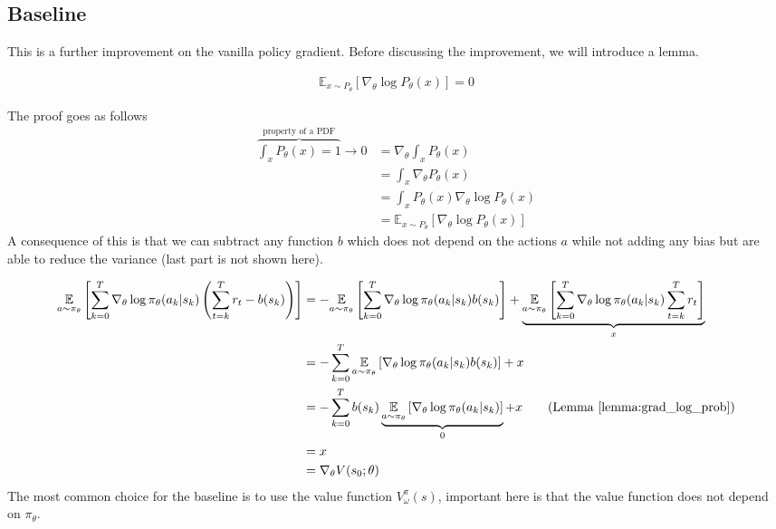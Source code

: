\subsection{Baseline}
This is a further improvement on the vanilla policy gradient. Before discussing the improvement,
we will introduce a lemma. 
\begin{lemma} \label{lemma:grad_log_prob}
    \begin{align}
    \mathbb{E}_{x\sim P_{\theta}}\left[\nabla_{\theta} \log{P_{\theta}(x)}\right] =0
\end{align}
\end{lemma}
The proof goes as follows 
\begin{align*}
    \overbrace{\int_x P_{\theta}(x) = 1}^{\text{property of a PDF}} \rightarrow  
    0&=\nabla_{\theta}\int_x P_{\theta}(x) \\
    &= \int_x \nabla_{\theta} P_{\theta}(x) \\
    &=  \int_x P_{\theta}(x) \nabla_{\theta} \log{P_{\theta}(x)} \\
    &=  \mathbb{E}_{x\sim P_{\theta}}\left[\nabla_{\theta} \log{P_{\theta}(x)}\right]
\end{align*}
A consequence of this is that we can subtract any function $b$ which does not depend on the actions 
$a$ while not adding any bias but are able to reduce the variance (last part is not shown here).

\begin{align*}
    \underset{a\sim\pi_\theta}{\mathbb{E}}\left[\sum_{k=0}^{T} \nabla_{\theta}\log{\pi_{\theta} (a_k|s_k) 
    \left(\sum_{t=k}^{T}r_t - b(s_k)\right)}\right] &=
     - \underset{a\sim\pi_\theta}{\mathbb{E}}\left[\sum_{k=0}^{T} \nabla_{\theta}\log{\pi_{\theta} (a_k|s_k) b(s_k)}\right] 
     + \underbrace{\underset{a\sim\pi_\theta}{\mathbb{E}}\left[\sum_{k=0}^{T} \nabla_{\theta}\log{\pi_{\theta} (a_k|s_k) 
    \sum_{t=k}^{T}r_t}\right]}_x\\
    &= -  \sum_{k=0}^{T}\underset{a\sim\pi_\theta}{\mathbb{E}}\left[\nabla_{\theta}\log{\pi_{\theta} (a_k|s_k) 
    b(s_k)}\right] + x\\
    &= -  \sum_{k=0}^{T}b(s_k)\underbrace{\underset{a\sim\pi_\theta}{\mathbb{E}}\left[\nabla_{\theta}\log{\pi_{\theta} (a_k|s_k)}\right]}_{0} +x  \qquad\text{(Lemma \ref{lemma:grad_log_prob})}\\
    &= x \\
    &= \nabla_{\theta} V(s_0;\theta)
\end{align*}
The most common choice for the baseline is to use the value function $V_\omega^{\pi}(s)$, 
important here is that the value function does not depend on $\pi_{\theta}$. 

